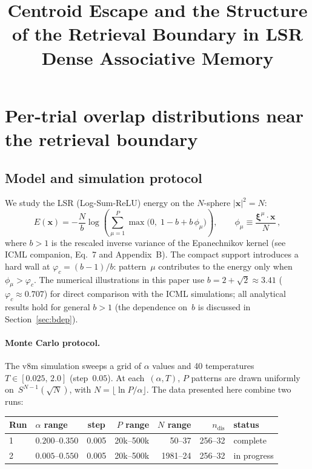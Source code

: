 \documentclass[11pt]{article}
\title{Centroid Escape and the Structure of the Retrieval Boundary in LSR Dense Associative Memory}
\author{}
\date{}
\newcommand{\bxi}{\boldsymbol{\xi}}
\newcommand{\bx}{\mathbf{x}}
\begin{document}
\maketitle

\section{Per-trial overlap distributions near the retrieval boundary}

\subsection{Model and simulation protocol}

We study the LSR (Log-Sum-ReLU) energy on the $N$-sphere $|\bx|^2 = N$:
\begin{equation}
E(\bx) = -\frac{N}{b}\log\left(\sum_{\mu=1}^{P}\max\!\Big(0,\;1 - b + b\,\phi_\mu\Big)\right),
\qquad \phi_\mu \equiv \frac{\bxi^\mu \cdot \bx}{N}\,,
\label{eq:lsr}
\end{equation}
where $b > 1$ is the rescaled inverse variance of the Epanechnikov kernel (see ICML companion, Eq.~7 and Appendix~B).  The compact support introduces a hard wall at $\varphi_c = (b-1)/b$: pattern~$\mu$ contributes to the energy only when $\phi_\mu > \varphi_c$.  The numerical illustrations in this paper use $b = 2+\sqrt{2} \approx 3.41$ ($\varphi_c \approx 0.707$) for direct comparison with the ICML simulations; all analytical results hold for general $b > 1$ (the dependence on~$b$ is discussed in Section~\ref{sec:bdep}).

\paragraph{Monte Carlo protocol.}
The v8m simulation sweeps a grid of $\alpha$ values and 40 temperatures $T \in [0.025,\,2.0]$ (step~$0.05$).  At each~$(\alpha, T)$, $P$ patterns are drawn uniformly on~$S^{N-1}(\!\sqrt{N})$, with $N = \lfloor\ln P/\alpha\rfloor$.  The data presented here combine two runs:

\begin{center}
\begin{tabular}{llcrrrl}
\toprule
Run & $\alpha$ range & step & $P$ range & $N$ range & $n_{\mathrm{dis}}$ & status \\
\midrule
1 & $0.200$--$0.350$ & 0.005 & 20k--500k & 50--37 & 256--32 & complete \\
2 & $0.005$--$0.550$ & 0.005 & 20k--500k & 1981--24 & 256--32 & in progress \\
\bottomrule
\end{tabular}
\end{center}
\end{document}
